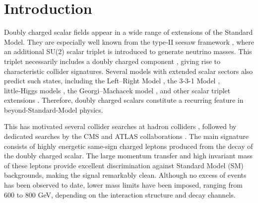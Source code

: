 \documentclass[aps, prev, twocolumn, preprintnumbers, floatfix, nofootinbib]{revtex4-1}
\begin{document}
\section{Introduction \label{SecI_introd}}

Doubly charged scalar fields appear in a wide range of extensions of the Standard Model. They are especially well known from the type‑II seesaw framework \cite{Mohapatra:1974hk, Senjanovic:1975rk}, where an additional SU(2) scalar triplet is introduced to generate neutrino masses. This triplet necessarily includes a doubly charged component \cite{Muhlleitner:2003me, Akeroyd:2005gt, Hektor:2007uu, FileviezPerez:2008wbg, Chaudhuri:2013xoa, Lindner:2016bgg, Primulando:2019evb}, giving rise to characteristic collider signatures. Several models with extended scalar sectors also predict such states, including the Left--Right Model \cite{Pati:1974yy, Dutta:2014dba, Dev:2016vle, Borah:2016hqn, Dev:2018kpa}, the 3-3-1 Model \cite{CiezaMontalvo:2006zt, Alves:2011kc, Alves:2012yp, Machado:2018sfh, CarcamoHernandez:2019vih, Ferreira:2019qpf}, little‑Higgs models \cite{ArkaniHamed:2002qx, Hektor:2007uu}, the Georgi--Machacek model \cite{Georgi:1985nv, Sun:2017mue, Chiang:2018cgb}, and other scalar triplet extensions \cite{Zee:1985id, Gunion:1989ci, Nebot:2007bc, Akeroyd:2012ms, deMedeirosVarzielas:2017glw, Ghosh:2018jpa, Camargo:2018uzw, Chala:2018opy, Chabab:2018ert, Chakraborty:2019uxk}. Therefore, doubly charged scalars constitute a recurring feature in beyond-Standard-Model physics.

This has motivated several collider searches at hadron colliders \cite{Huitu:1996su, Akeroyd:2005gt, Han:2007bk, Chao:2008mq, Akeroyd:2010ip, Chiang:2012dk, delAguila:2013mia, Kanemura:2013vxa, King:2014uha, kang:2014jia, Kanemura:2014ipa, Bambhaniya:2015wna, Mitra:2016wpr, Du:2018eaw}, followed by dedicated searches by the CMS and ATLAS collaborations \cite{CMS:2012kua, ATLAS:2012hi, Chatrchyan:2012ya, ATLAS:2014kca, ATLAS:2016pbt, CMS:2016cpz, CMS:2017pet, Aaboud:2017qph}. The main signature consists of highly energetic same-sign charged leptons produced from the decay of the doubly charged scalar. The large momentum transfer and high invariant mass of these leptons provide excellent discrimination against Standard Model (SM) backgrounds, making the signal remarkably clean. Although no excess of events has been observed to date, lower mass limits have been imposed, ranging from 600 to 800 GeV, depending on the interaction structure and decay channels.
\end{document}

